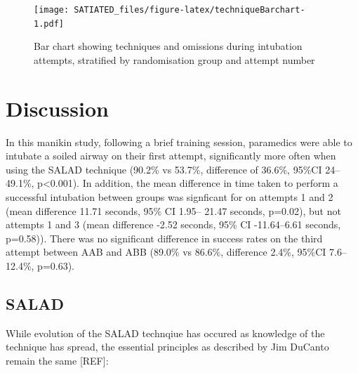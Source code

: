 \documentclass[]{article}
\begin{document}
\begin{figure}
\centering
\texttt{[image: SATIATED\_files/figure-latex/techniqueBarchart-1.pdf]}
\caption{\label{fig:techniqueBarchart}Bar chart showing techniques and
omissions during intubation attempts, stratified by randomisation group
and attempt number}
\end{figure}

\hypertarget{discussion}{%
\section{Discussion}\label{discussion}}

In this manikin study, following a brief training session, paramedics
were able to intubate a soiled airway on their first attempt,
significantly more often when using the SALAD technique (90.2\% vs
53.7\%, difference of 36.6\%, 95\%CI 24--49.1\%, p\textless{}0.001). In
addition, the mean difference in time taken to perform a successful
intubation between groups was signficant for on attempts 1 and 2 (mean
difference 11.71 seconds, 95\% CI 1.95-- 21.47 seconds, p=0.02), but not
attempts 1 and 3 (mean difference -2.52 seconds, 95\% CI -11.64--6.61
seconds, p=0.58)). There was no significant difference in success rates
on the third attempt between AAB and ABB (89.0\% vs 86.6\%, difference
2.4\%, 95\%CI 7.6--12.4\%, p=0.63).

\hypertarget{salad}{%
\subsection{SALAD}\label{salad}}

While evolution of the SALAD technqiue has occured as knowledge of the
technique has spread, the essential principles as described by Jim
DuCanto remain the same {[}REF{]}:
\end{document}
